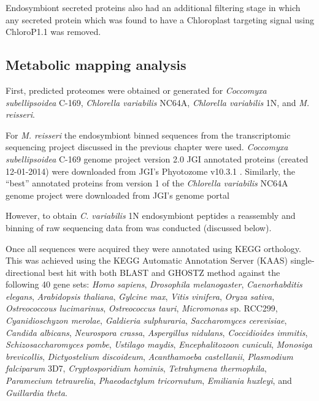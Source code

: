Endosymbiont secreted proteins also had an additional filtering stage in which
any secreted protein which was found to have a Chloroplast targeting signal 
using ChloroP1.1 was removed.


\subsection{Metabolic mapping analysis}

First, predicted proteomes were obtained or generated for
\textit{Coccomyxa subellipsoidea} C-169, \textit{Chlorella variabilis}
NC64A, \textit{Chlorella variabilis} 1N, and \textit{M. reisseri}. 

For \textit{M. reisseri} the endosymbiont binned sequences from the transcriptomic
sequencing project discussed in the previous chapter were used. 
\textit{Coccomyxa subellipsoidea} C-169 genome project \citep{Blanc2012} version 2.0 
JGI annotated proteins (created 12-01-2014) were downloaded from JGI's
Phyotozome v10.3.1 \citep{Goodstein2012}. 
Similarly, the ``best'' annotated proteins from
version 1 of the \textit{Chlorella variabilis} NC64A genome project \citep{Blanc2010}
were downloaded from JGI's genome portal \citep{Grigoriev2011,Nordberg2014}

However, to obtain \textit{C. variabilis} 1N endosymbiont peptides 
a reassembly and binning of raw sequencing data from \citep{Kodama2014}
was conducted (discussed below). 

Once all sequences were acquired they were annotated using KEGG
orthology.  This was achieved 
using the KEGG Automatic Annotation Server (KAAS) \citep{Moriya2007a}
single-directional best hit with both BLAST and GHOSTZ \citep{Suzuki2014,Suzuki2015} 
method against the following 40 gene sets: \textit{Homo sapiens}, 
\textit{Drosophila melanogaster}, \textit{Caenorhabditis elegans},
\textit{Arabidopsis thaliana}, \textit{Gylcine max},
\textit{Vitis vinifera}, \textit{Oryza sativa}, 
\textit{Ostreococcous lucimarinus}, \textit{Ostreococcus tauri},
\textit{Micromonas} sp. RCC299, \textit{Cyanidioschyzon merolae},
\textit{Galdieria sulphuraria}, \textit{Saccharomyces cerevisiae},
\textit{Candida albicans}, \textit{Neurospora crassa}, \textit{Aspergillus nidulans},
\textit{Coccidioides immitis}, \textit{Schizosaccharomyces pombe},
\textit{Ustilago maydis}, \textit{Encephalitozoon cuniculi},
\textit{Monosiga brevicollis}, \textit{Dictyostelium discoideum}, 
\textit{Acanthamoeba castellanii}, \textit{Plasmodium falciparum} 3D7, 
\textit{Cryptosporidium hominis}, \textit{Tetrahymena thermophila},
\textit{Paramecium tetraurelia}, \textit{Phaeodactylum tricornutum},
\textit{Emiliania huxleyi}, and \textit{Guillardia theta}.

